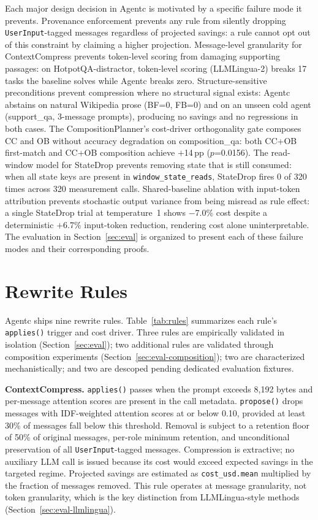 Each major design decision in Agentc is motivated by a specific failure mode it
prevents. Provenance enforcement prevents any rule from silently dropping
\texttt{UserInput}-tagged messages regardless of projected savings: a rule cannot
opt out of this constraint by claiming a higher projection. Message-level granularity
for ContextCompress prevents token-level scoring from damaging supporting passages:
on HotpotQA-distractor, token-level scoring (LLMLingua-2) breaks 17 tasks the
baseline solves while Agentc breaks zero. Structure-sensitive preconditions prevent
compression where no structural signal exists: Agentc abstains on natural Wikipedia
prose (BF=0, FB=0) and on an unseen cold agent (support\_qa, 3-message prompts),
producing no savings and no regressions in both cases. The CompositionPlanner's
cost-driver orthogonality gate composes CC and OB without accuracy degradation on
composition\_qa: both CC+OB first-match and CC+OB composition achieve $+$14\,pp
($p$=0.0156). The read-window model for StateDrop prevents removing state that is
still consumed: when all state keys are present in \texttt{window\_state\_reads},
StateDrop fires 0 of 320 times across 320 measurement calls. Shared-baseline
ablation with input-token attribution prevents stochastic output variance from being
misread as rule effect: a single StateDrop trial at temperature~1 shows $-$7.0\% cost
despite a deterministic $+$6.7\% input-token reduction, rendering cost alone
uninterpretable. The evaluation in Section~\ref{sec:eval} is organized to present
each of these failure modes and their corresponding proofs.

\section{Rewrite Rules}
\label{sec:rules}

Agentc ships nine rewrite rules. Table~\ref{tab:rules} summarizes each rule's
\texttt{applies()} trigger and cost driver. Three rules are empirically validated in
isolation (Section~\ref{sec:eval}); two additional rules are validated through
composition experiments (Section~\ref{sec:eval-composition}); two are characterized
mechanistically; and two are descoped pending dedicated evaluation fixtures.

\textbf{ContextCompress.} \texttt{applies()} passes when the prompt exceeds 8,192
bytes and per-message attention scores are present in the call metadata.
\texttt{propose()} drops messages with IDF-weighted attention scores at or below 0.10,
provided at least 30\% of messages fall below this threshold. Removal is subject to a
retention floor of 50\% of original messages, per-role minimum retention, and
unconditional preservation of all \texttt{UserInput}-tagged messages. Compression is
extractive; no auxiliary LLM call is issued because its cost would exceed expected
savings in the targeted regime. Projected savings are estimated as
\texttt{cost\_usd.mean} multiplied by the fraction of messages removed. This rule
operates at message granularity, not token granularity, which is the key distinction
from LLMLingua-style methods (Section~\ref{sec:eval-llmlingua}).

